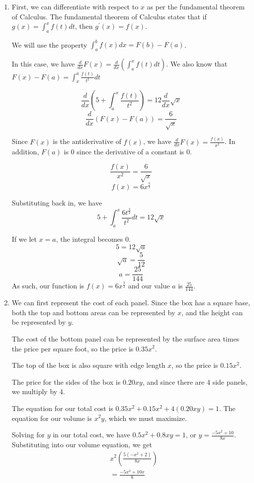 \documentclass[11pt, letterpaper, twoside]{article}
\begin{document}
\begin{enumerate}
\item %
First, we can differentiate with respect to \(x\) as per the fundamental theorem of Calculus.
The fundamental theorem of Calculus states that if \(g(x)=\int_a^xf(t)dt\), then \(g^\prime(x)=f(x)\).

We will use the property \(\int_a^bf(x)dx=F(b)-F(a)\).

In this case, we have \(\frac{d}{dx}F(x)=\frac{d}{dx}\left(\int^x_af(t)dt\right)\). 
We also know that \(F(x)-F(a)=\int_x^a\frac{f(t)}{t^2}dt\)

\[\frac{d}{dx}(5+\int_a^x\frac{f(t)}{t^2})=12\frac{d}{dx}\sqrt{x}\]
\[\frac{d}{dx}(F(x)-F(a))=\frac{6}{\sqrt{x}}\]

Since \(F(x)\) is the antiderivative of \(f(x)\), we have \(\frac{d}{dx}F(x)=\frac{f(x)}{x^2}\).
In addition, \(F(a)\) is 0 since the derivative of a constant is 0.

\[\frac{f(x)}{x^2}=\frac{6}{\sqrt{x}}\]
\[f(x)=6x^{\frac{3}{2}}\]

Substituting back in, we have 
\[5+\int_a^x\frac{6t^{\frac{3}{2}}}{t^2}dt=12\sqrt x\]

If we let \(x=a\), the integral becomes 0.
\[5=12\sqrt a\]
\[\sqrt a=\frac{5}{12}\]
\[a=\frac{25}{144}\]
As such, our function is \(f(x)=6x^{\frac{3}{2}}\) and our value \(a\) is $\frac{25}{144}$.

\item %
We can first represent the cost of each panel. 
Since the box has a square base, both the top and bottom areas can be represented by \(x\), and the height can be represented by \(y\).

The cost of the bottom panel can be represented by the surface area times the price per square foot, so the price is \(0.35x^2\).

The top of the box is also square with edge length \(x\), so the price is \(0.15x^2\).

The price for the sides of the box is \(0.20xy\), and since there are 4 side panels, we multiply by 4.

The equation for our total cost is \(0.35x^2+0.15x^2+4(0.20xy)=1\).
The equation for our volume is \(x^2y\), which we must maximize.

Solving for \(y\) in our total cost, we have \(0.5x^2+0.8xy=1\), or \(y=\frac{-5x^2+10}{8x}\).
Substituting into our volume equation, we get 
\begin{align*}
&x^2\left(\frac{5(-x^2+2)}{8x}\right)\\
&=\frac{-5x^3+10x}{8}
\end{align*}


\end{enumerate}
\end{document}
